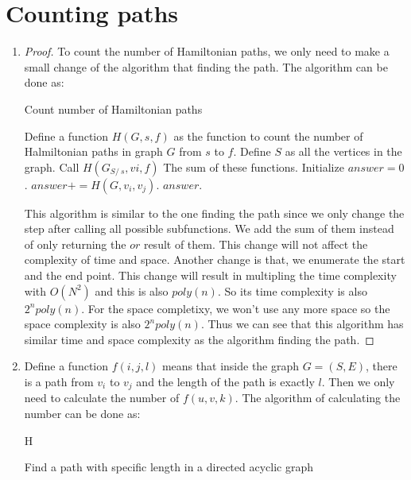 \documentclass{article}
\begin{document}
	\section{Counting paths}
		\begin{enumerate}
			\item \begin{proof} To count the number of Hamiltonian paths, we only need to make a small change of the algorithm that finding the path. The algorithm can be done as:
			\begin{algorithm}[H]
				\caption{Count number of Hamiltonian paths}
				\begin{algorithmic}[1]
					\State Define a function $H(G, s, f)$ as the function to count the number of Halmiltonian paths in graph $G$ from $s$ to $f$. Define $S$ as all the vertices in the graph.
					\State {}
						\State {}
							\State Call $H(G_{S /\ s}, vi, f)$
						\EndFor
						\State \Return The sum of these functions.
					\EndFor
					\State Initialize $answer = 0$.
							\State $answer += H(G, v_i, v_j)$.		
						\EndFor
					\EndFor
					\State \Return $answer$.
				\end{algorithmic}
			\end{algorithm}
			This algorithm is similar to the one finding the path since we only change the step after calling all possible subfunctions. We add the sum of them instead of only returning the $or$ result of them. This change will not affect the complexity of time and space. Another change is that, we enumerate the start and the end point. This change will result in multipling the time complexity with $O(N^2)$ and this is also $poly(n)$. So its time complexity is also $2^n poly(n)$. For the space completixy, we won't use any more space so the space complexity is also $2^n poly(n)$. Thus we can see that this algorithm has similar time and space complexity as the algorithm finding the path.
			\end{proof}
			\item Define a function $f(i, j, l)$ means that inside the graph $G = (S, E)$, there is a path from $v_i$ to $v_j$ and the length of the path is exactly $l$. Then we only need to calculate the number of $f(u, v, k)$. The algorithm of calculating the number can be done as:
			\begin{algorithm}{H}
				\caption{Find a path with specific length in a directed acyclic graph}
				\begin{algorithmic}[1]

\end{algorithmic}
\end{algorithm}
\end{enumerate}
\end{document}

